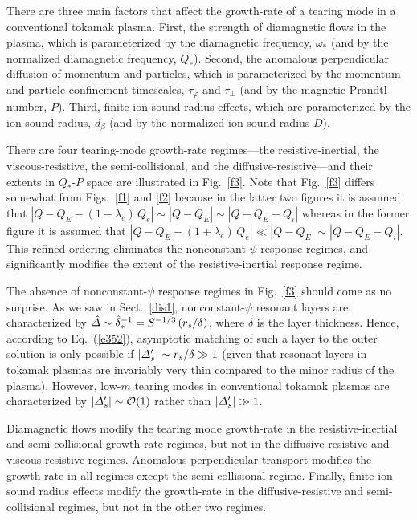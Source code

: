 \documentclass[12pt,prb,aps]{revtex4-1}
\begin{document}
There are three main factors that
affect the growth-rate of a tearing mode in a conventional tokamak plasma. First, the strength of diamagnetic flows in the plasma, which is parameterized by the
diamagnetic frequency, $\omega_\ast$ (and by the normalized diamagnetic frequency, $Q_\ast$). Second, the  anomalous perpendicular diffusion of momentum and particles, which is parameterized by the momentum and particle confinement
timescales, $\tau_\varphi$ and $\tau_\perp$ (and by the magnetic Prandtl number, $P$). Third, finite ion sound radius effects,  which are parameterized by the ion sound radius, $d_\beta$ (and by the normalized ion 
sound radius $D$).

 There are four tearing-mode growth-rate regimes---the resistive-inertial, the viscous-resistive, the semi-collisional, and the diffusive-resistive---and their extents in $Q_\ast$-$P$ space are illustrated in Fig.~\ref{f3}.
Note that Fig.~\ref{f3} differs somewhat from Figs.~\ref{f1} and \ref{f2} because in the latter two
figures it is assumed that $|Q-Q_E-(1+\lambda_e)\,Q_e|\sim |Q-Q_E|\sim |Q-Q_E-Q_i|$ whereas
in the former figure it is assumed that $|Q-Q_E-(1+\lambda_e)\,Q_e|\ll |Q-Q_E|\sim |Q-Q_E-Q_i|$.
This refined ordering eliminates the nonconstant-$\psi$ response regimes, and significantly modifies the
extent of the resistive-inertial response regime. 

The absence of nonconstant-$\psi$ response regimes in Fig.~\ref{f3}
should come as no surprise. As we saw in Sect.~\ref{dis1}, nonconstant-$\psi$ resonant layers
are characterized by $\hat{\mit\Delta}\sim\hat{\delta}_\ast^{-1}= S^{-1/3}\,(r_s/\delta)$, where $\delta$
is the layer thickness. Hence, according to Eq.~(\ref{e352}), asymptotic matching of such a
layer to the outer solution is only possible if $|{\mit\Delta}_s'|\sim r_s/\delta \gg 1$ (given that resonant
layers in tokamak plasmas are invariably very thin compared to the minor radius of the plasma). However,
low-$m$ tearing modes in conventional tokamak plasmas are characterized by $|{\mit\Delta}_s'|\sim {\cal O}(1)$ rather than
$|{\mit\Delta}_s'|\gg 1$. 

Diamagnetic flows modify the tearing mode growth-rate in the resistive-inertial and semi-collisional
growth-rate regimes, but not in the diffusive-resistive and viscous-resistive regimes. Anomalous perpendicular
transport modifies the growth-rate in all regimes except the semi-collisional regime. Finally, finite ion sound radius 
effects modify the growth-rate in the diffusive-resistive and semi-collisional regimes, but not in the other two
regimes. 
\end{document}
